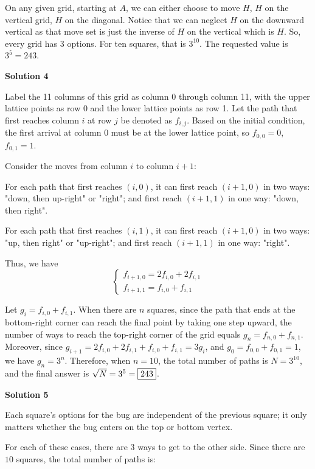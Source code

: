 \begin{enumerate}
 On any given grid, starting at $A$, we can either choose to move $H$, $H$ on the vertical grid, $H$ on the diagonal. Notice that we can neglect $H$ on the downward vertical as that move set is just the inverse of $H$ on the vertical which is $H$. So, every grid has 3 options. For ten squares, that is $3^{10}$. The requested value is $3^5 = \boxed{243}$.

 



\textbf{Solution 4}

Label the 11 columns of this grid as column 0 through column 11, with the upper lattice points as row 0 and the lower lattice points as row 1. Let the path that first reaches column $i$ at row $j$ be denoted as $f_{i,j}$. Based on the initial condition, the first arrival at column 0 must be at the lower lattice point, so $f_{0,0}=0$, $f_{0,1}=1$.

 Consider the moves from column $i$ to column $i+1$:

 For each path that first reaches $(i,0)$, it can first reach $(i+1,0)$ in two ways: "down, then up-right" or "right"; and first reach $(i+1,1)$ in one way: "down, then right".

 For each path that first reaches $(i,1)$, it can first reach $(i+1,0)$ in two ways: "up, then right" or "up-right"; and first reach $(i+1,1)$ in one way: "right".

 Thus, we have
 \[\begin{cases} f_{i+1,0}=2f_{i,0}+2f_{i,1} \\ f_{i+1,1}=f_{i,0}+f_{i,1} \end{cases}\]

 Let $g_i = f_{i,0} + f_{i,1}$. When there are $n$ squares, since the path that ends at the bottom-right corner can reach the final point by taking one step upward, the number of ways to reach the top-right corner of the grid equals $g_n = f_{n,0} + f_{n,1}$. Moreover, since $g_{i+1} = 2f_{i,0} + 2f_{i,1} + f_{i,0} + f_{i,1} = 3g_i$, and $g_0 = f_{0,0} + f_{0,1} = 1$, we have $g_n = 3^n$. Therefore, when $n=10$, the total number of paths is $N = 3^{10}$, and the final answer is $\sqrt N = 3^5 = \fbox{243}$.

 



\textbf{Solution 5}

Each square's options for the bug are independent of the previous square; it only matters whether the bug enters on the top or bottom vertex.

 For each of these cases, there are $3$ ways to get to the other side. Since there are $10$ squares, the total number of paths is:


\end{enumerate}

